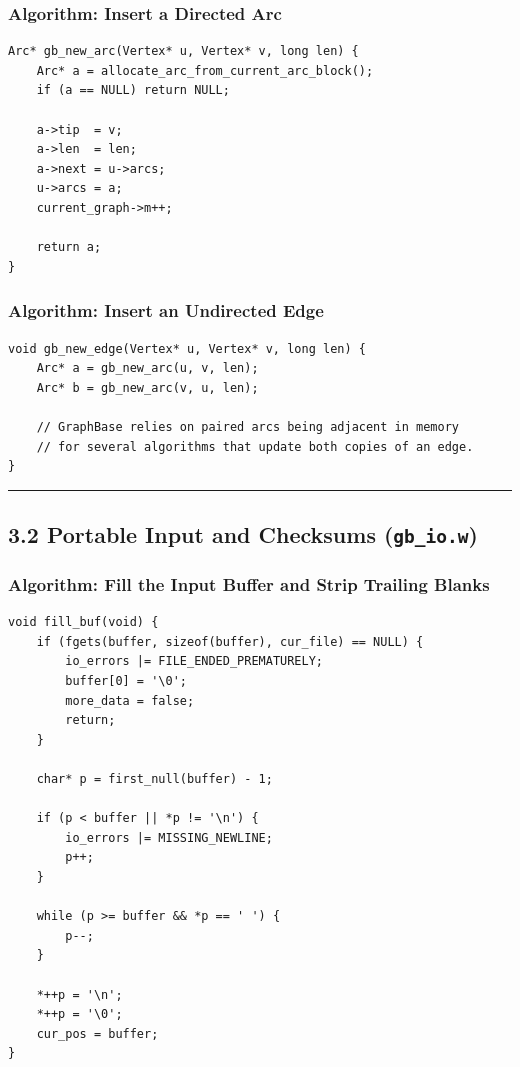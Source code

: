 \documentclass[11pt]{article}
\begin{document}
\subsubsection{Algorithm: Insert a Directed Arc}\label{algorithm-insert-a-directed-arc}

\begin{verbatim}
Arc* gb_new_arc(Vertex* u, Vertex* v, long len) {
    Arc* a = allocate_arc_from_current_arc_block();
    if (a == NULL) return NULL;

    a->tip  = v;
    a->len  = len;
    a->next = u->arcs;
    u->arcs = a;
    current_graph->m++;

    return a;
}
\end{verbatim}

\subsubsection{Algorithm: Insert an Undirected Edge}\label{algorithm-insert-an-undirected-edge}

\begin{verbatim}
void gb_new_edge(Vertex* u, Vertex* v, long len) {
    Arc* a = gb_new_arc(u, v, len);
    Arc* b = gb_new_arc(v, u, len);

    // GraphBase relies on paired arcs being adjacent in memory
    // for several algorithms that update both copies of an edge.
}
\end{verbatim}

\begin{center}\rule{0.5\linewidth}{0.5pt}\end{center}

\subsection{\texorpdfstring{3.2 Portable Input and Checksums (\texttt{gb\_io.w})}{3.2 Portable Input and Checksums (gb\_io.w)}}\label{portable-input-and-checksums-gb_io.w}

\subsubsection{Algorithm: Fill the Input Buffer and Strip Trailing Blanks}\label{algorithm-fill-the-input-buffer-and-strip-trailing-blanks}

\begin{verbatim}
void fill_buf(void) {
    if (fgets(buffer, sizeof(buffer), cur_file) == NULL) {
        io_errors |= FILE_ENDED_PREMATURELY;
        buffer[0] = '\0';
        more_data = false;
        return;
    }

    char* p = first_null(buffer) - 1;

    if (p < buffer || *p != '\n') {
        io_errors |= MISSING_NEWLINE;
        p++;
    }

    while (p >= buffer && *p == ' ') {
        p--;
    }

    *++p = '\n';
    *++p = '\0';
    cur_pos = buffer;
}
\end{verbatim}
\end{document}
